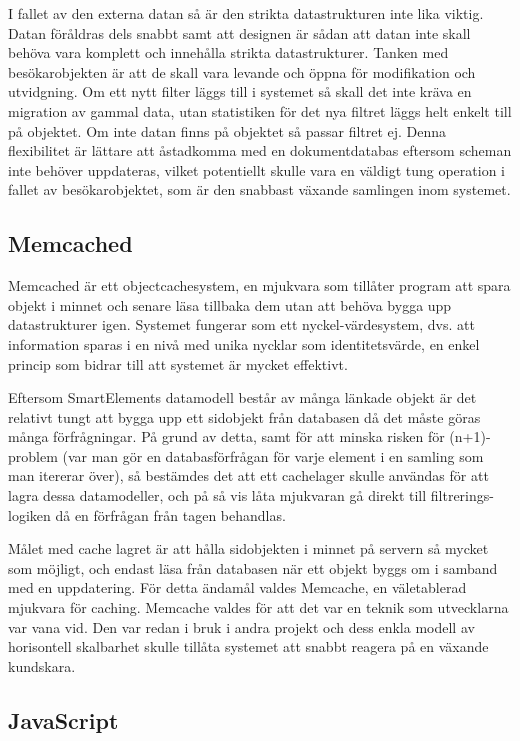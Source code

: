 I fallet av den externa datan så är den strikta datastrukturen inte lika viktig. Datan föråldras dels snabbt samt att designen är sådan att datan inte skall behöva vara komplett och innehålla strikta datastrukturer. Tanken med besökarobjekten är att de skall vara levande och öppna för modifikation och utvidgning. Om ett nytt filter läggs till i systemet så skall det inte kräva en migration av gammal data, utan statistiken för det nya filtret läggs helt enkelt till på objektet. Om inte datan finns på objektet så passar filtret ej. Denna flexibilitet är lättare att åstadkomma med en dokumentdatabas eftersom scheman inte behöver uppdateras, vilket potentiellt skulle vara en väldigt tung operation i fallet av besökarobjektet, som är den snabbast växande samlingen inom systemet.

\subsection{Memcached}

Memcached är ett objectcachesystem, en mjukvara som tillåter program att spara objekt i minnet och senare läsa tillbaka dem utan att behöva bygga upp datastrukturer igen. Systemet fungerar som ett nyckel-värdesystem, dvs. att information sparas i en nivå med unika nycklar som identitetsvärde, en enkel princip som bidrar till att systemet är mycket effektivt. \citep{memcachedwiki}

Eftersom SmartElements datamodell består av många länkade objekt är det relativt tungt att bygga upp ett sidobjekt från databasen då det måste göras många förfrågningar. På grund av detta, samt för att minska risken för (n+1)-problem (var man gör en databasförfrågan för varje element i en samling som man itererar över), så bestämdes det att ett cachelager skulle användas för att lagra dessa datamodeller, och på så vis låta mjukvaran gå direkt till filtrerings-logiken då en förfrågan från tagen behandlas.

Målet med cache lagret är att hålla sidobjekten i minnet på servern så mycket som möjligt, och endast läsa från databasen när ett objekt byggs om i samband med en uppdatering. För detta ändamål valdes Memcache, en väletablerad mjukvara för caching. Memcache valdes för att det var en teknik som utvecklarna var vana vid. Den var redan i bruk i andra projekt och dess enkla modell av horisontell skalbarhet skulle tillåta systemet att snabbt reagera på en växande kundskara.

\subsection{JavaScript}


